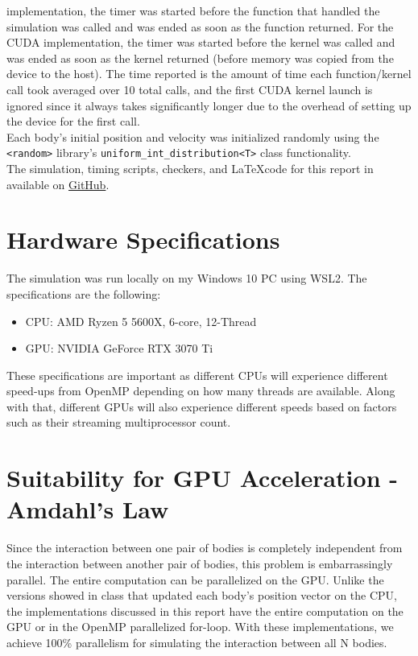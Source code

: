 implementation, the timer was started before the function that handled the simulation was called and
was ended as soon as the function returned. For the CUDA implementation, the timer was started before
the kernel was called and was ended as soon as the kernel returned (before memory was copied from the 
device to the host). The time reported is the amount of time each function/kernel call took
averaged over 10 total calls, and the first CUDA kernel launch is ignored since it always 
takes significantly longer due to the overhead of setting up the device for the first call.\\
\indent Each body's initial position and velocity was initialized randomly using the \verb|<random>| library's 
\verb|uniform_int_distribution<T>| class functionality.\\
\indent The simulation, timing scripts, checkers, and \LaTeX  code for this report
in available on \href{https://github.com/robertfeliciano/nbody}{GitHub}.

\section{Hardware Specifications} 
The simulation was run locally on my Windows 10 PC using WSL2. The specifications are the following:
\begin{itemize}
    \item CPU: AMD Ryzen 5 5600X, 6-core, 12-Thread
    \item GPU: NVIDIA GeForce RTX 3070 Ti
\end{itemize}
These specifications are important as different CPUs will experience different speed-ups
from OpenMP depending on how many threads are available. Along with that, different GPUs
will also experience different speeds based on factors such as their streaming multiprocessor
count.

\section{Suitability for GPU Acceleration - Amdahl's Law}
Since the interaction between one pair of bodies is completely independent from the 
interaction between another pair of bodies, this problem is embarrassingly parallel. 
The entire computation can be parallelized on the GPU. Unlike the versions showed in 
class that updated each body's position vector on the CPU, the implementations 
discussed in this report have the entire computation on the GPU or in the OpenMP 
parallelized for-loop. With these implementations, we achieve 100\% parallelism for simulating
the interaction between all N bodies.

